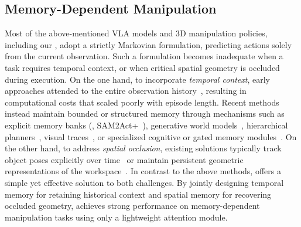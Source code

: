 \subsection{Memory-Dependent Manipulation}
Most of the above-mentioned VLA models and 3D manipulation policies,
including our \method, adopt a strictly Markovian formulation, predicting
actions solely from the current observation.
Such a formulation becomes inadequate when a task requires temporal
context, or when critical spatial geometry is occluded during execution.
On the one hand, to incorporate \emph{temporal context}, early approaches
attended to the entire observation history~\cite{guhur2023instruction},
resulting in computational costs that scaled poorly with episode length.
Recent methods instead maintain bounded or structured memory through
mechanisms such as explicit memory banks
(\eg, SAM2Act+~\cite{fang2025sam2act}), generative
world models~\cite{li2026lingbotva,yang2026wla,yang2026memorywam},
hierarchical planners~\cite{chen2026rmbench}, visual
traces~\cite{zheng2024tracevla}, or specialized cognitive or gated memory
modules~\cite{lei2025robomemory,shi2026memoryvla,gao2026gatedmemory}.
On the other hand, to address \emph{spatial occlusion}, existing solutions
typically track object poses explicitly over time~\cite{zhou2024yoso} or
maintain persistent geometric representations of the
workspace~\cite{zheng2026memworld}.
In contrast to the above methods, \memmethod offers a simple yet effective
solution to both challenges.
By jointly designing temporal memory for retaining historical context and
spatial memory for recovering occluded geometry, \memmethod achieves strong
performance on memory-dependent manipulation tasks using only a lightweight
attention module.